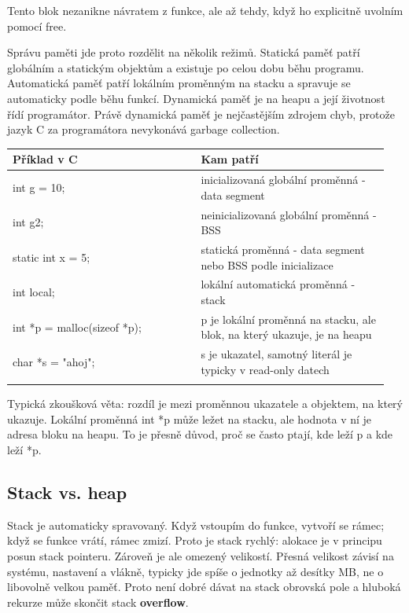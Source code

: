 \documentclass[11pt,a4paper]{article}
\begin{document}
Tento blok nezanikne návratem z funkce, ale až tehdy, když ho explicitně uvolním pomocí free.

Správu paměti jde proto rozdělit na několik režimů. Statická paměť patří globálním a statickým objektům a existuje po celou dobu běhu programu. Automatická paměť patří lokálním proměnným na stacku a spravuje se automaticky podle běhu funkcí. Dynamická paměť je na heapu a její životnost řídí programátor. Právě dynamická paměť je nejčastějším zdrojem chyb, protože jazyk C za programátora nevykonává garbage collection.

\begin{longtable}{p{0.475\linewidth}p{0.475\linewidth}}
\toprule
\textbf{Příklad v C} & \textbf{Kam patří} \\
\midrule\endhead
int g = 10; & inicializovaná globální proměnná - data segment \\
\addlinespace
int g2; & neinicializovaná globální proměnná - BSS \\
\addlinespace
static int x = 5; & statická proměnná - data segment nebo BSS podle inicializace \\
\addlinespace
int local; & lokální automatická proměnná - stack \\
\addlinespace
int *p = malloc(sizeof *p); & p je lokální proměnná na stacku, ale blok, na který ukazuje, je na heapu \\
\addlinespace
char *s = "ahoj"; & s je ukazatel, samotný literál je typicky v read-only datech \\
\addlinespace
\bottomrule
\end{longtable}

Typická zkoušková věta: rozdíl je mezi proměnnou ukazatele a objektem, na který ukazuje. Lokální proměnná int *p může ležet na stacku, ale hodnota v ní je adresa bloku na heapu. To je přesně důvod, proč se často ptají, kde leží p a kde leží *p.

\subsection*{Stack vs. heap}

Stack je automaticky spravovaný. Když vstoupím do funkce, vytvoří se rámec; když se funkce vrátí, rámec zmizí. Proto je stack rychlý: alokace je v principu posun stack pointeru. Zároveň je ale omezený velikostí. Přesná velikost závisí na systému, nastavení a vlákně, typicky jde spíše o jednotky až desítky MB, ne o libovolně velkou paměť. Proto není dobré dávat na stack obrovská pole a hluboká rekurze může skončit stack \textbf{overflow}.
\end{document}
